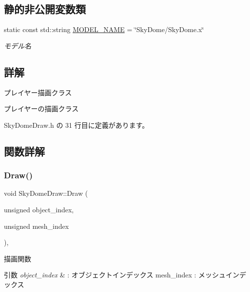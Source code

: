 \subsection*{静的非公開変数類}
\begin{DoxyCompactItemize}
\item 
static const std\+::string \mbox{\hyperlink{class_sky_dome_draw_a366fd9d1040d77ddac71e335f10f2c29}{M\+O\+D\+E\+L\+\_\+\+N\+A\+ME}} = \char`\"{}Sky\+Dome/Sky\+Dome.\+x\char`\"{}
\begin{DoxyCompactList}\small\item\em モデル名 \end{DoxyCompactList}\end{DoxyCompactItemize}


\subsection{詳解}
プレイヤー描画クラス 

プレイヤーの描画クラス 

 Sky\+Dome\+Draw.\+h の 31 行目に定義があります。



\subsection{関数詳解}
\mbox{\label{class_sky_dome_draw_a42364ea42618cbab588d55050edfe95a}} 
\subsubsection{\texorpdfstring{Draw()}{Draw()}}
{\footnotesize\ttfamily void Sky\+Dome\+Draw\+::\+Draw (\begin{DoxyParamCaption}\item[{unsigned}]{object\+\_\+index,  }\item[{unsigned}]{mesh\+\_\+index }\end{DoxyParamCaption})\hspace{0.3cm}{\ttfamily [override]}, {\ttfamily [virtual]}}



描画関数 


\begin{DoxyParams}{引数}
{\em object\+\_\+index} & \+: オブジェクトインデックス mesh\+\_\+index \+: メッシュインデックス \\
\hline
\end{DoxyParams}


